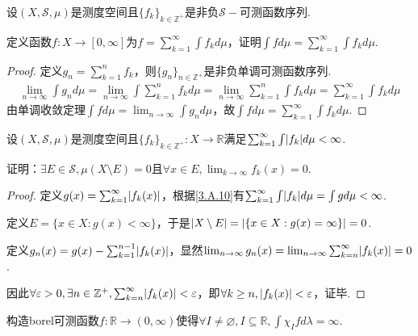 \begin{problem}[10]\label{3.A.10}
    设\((X, \mathcal{S}, \mu)\)是测度空间且\(\{f_k\}_{k \in \mathbb{Z}^+}\)是非负\(\mathcal{S}-\)可测函数序列.

    定义函数\(f: X \to [0,\infty]\)为\(f=\sum_{k=1}^\infty \int f_k d\mu\)，证明\(\int f d\mu=\sum_{k=1}^\infty \int f_k d\mu\).
\end{problem}

\begin{proof}
    定义\(g_n=\sum_{k=1}^n f_k\)，则\(\{g_n\}_{n \in \mathbb{Z}^+}\)是非负单调可测函数序列.
    \begin{align*}
        \lim_{n \to \infty} \int g_n d\mu=\lim_{n \to \infty} \int \sum_{k=1}^n f_k d\mu
        =\lim_{n \to \infty} \sum_{k=1}^n \int f_k d\mu=\sum_{k=1}^\infty \int f_k d\mu
    \end{align*}
    由单调收敛定理\(\int f d\mu=\lim_{n \to \infty} \int g_n d\mu\)，故\(\int f d\mu=\sum_{k=1}^\infty \int f_k d\mu\).
\end{proof}

\newpage

\begin{problem}[11]\label{3.A.11}
    设\((X, \mathcal{S}, \mu)\)是测度空间且\(\{f_k\}_{k \in \mathbb{Z}^+}: X \to \mathbb{R}\)满足\(\sum_{k=1}^\infty \int \abs*{f_k} d\mu<\infty\).

    证明：\(\exists E \in \mathcal{S}, \mu(X \setminus E)=0\)且\(\forall x \in E, \lim_{k \to \infty}f_k(x)=0\).
\end{problem}

\begin{proof}
    定义\(g(x)=\sum_{k=1}^\infty \abs*{f_k(x)}\)，根据\cref{3.A.10}有\(\sum_{k=1}^\infty \int \abs*{f_k} d\mu=\int g d\mu<\infty\).

    定义\(E=\{x \in X: g(x)<\infty\}\)，于是\(\abs*{X \setminus E}=\abs*{\{x \in X: g(x)=\infty\}}=0\).

    定义\(g_n(x)=g(x)-\sum_{k=1}^{n-1}\abs*{f_k(x)}\)，显然\(\lim_{n \to \infty} g_n(x)=\lim_{n \to \infty}\sum_{k=n}^\infty \abs*{f_k(x)}=0\).

    因此\(\forall \varepsilon>0, \exists n \in \mathbb{Z}^+, \sum_{k=n}^\infty \abs*{f_k(x)}<\varepsilon\)，即\(\forall k \geq n, \abs*{f_k(x)}<\varepsilon\)，证毕.
\end{proof}

\begin{problem}[12]\label{3.A.12}
    构造borel可测函数\(f: \mathbb{R} \to (0,\infty)\)使得\(\forall I \ne \varnothing, I \subseteq \mathbb{R}, \int \chi_I f d\lambda=\infty\).
\end{problem}

